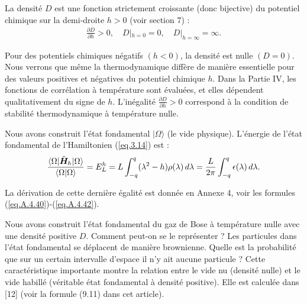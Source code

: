 La densité \( D \) est une fonction strictement croissante (donc bijective) du potentiel chimique sur la demi-droite \( h > 0 \) (voir section 7) :
\begin{eqnarray}
	\frac{\partial D}{\partial h} > 0, \quad D|_{h=0} = 0, \quad D|_{h = \infty} = \infty.	
\end{eqnarray}

Pour des potentiels chimiques négatifs \( (h < 0) \), la densité est nulle \( (D = 0) \). Nous verrons que même la thermodynamique diffère de manière essentielle pour des valeurs positives et négatives du potentiel chimique \( h \). Dans la Partie IV, les fonctions de corrélation à température sont évaluées, et elles dépendent qualitativement du signe de \( h \). L'inégalité \( \frac{\partial D}{\partial h} > 0 \) correspond à la condition de stabilité thermodynamique à température nulle.

Nous avons construit l'état fondamental \( | \Omega \rangle \) (le vide physique). L'énergie de l'état fondamental de l'Hamiltonien (\ref{eq.3.14}) est :
\begin{eqnarray}
	\frac{ \langle \Omega \vert \hat{\bm{H}}_h \vert  \Omega \rangle }{ \langle \Omega \vert \Omega \rangle } = E_L^h = L \int_{-q}^q (\lambda^2-h) \rho ( \lambda ) \, d\lambda = \frac{L}{2\pi} \int_{-q}^q \epsilon( \lambda ) \, d \lambda  .	
\end{eqnarray}

La dérivation de cette dernière égalité est donnée en Annexe 4, voir les formules (\ref{eq.A.4.40})-(\ref{eq.A.4.42}).

Nous avons construit l'état fondamental du gaz de Bose à température nulle avec une densité positive \( D \). Comment peut-on se le représenter ? Les particules dans l'état fondamental se déplacent de manière brownienne. Quelle est la probabilité que sur un certain intervalle d'espace il n'y ait aucune particule ? Cette caractéristique importante montre la relation entre le vide nu (densité nulle) et le vide habillé (véritable état fondamental à densité positive). Elle est calculée dans [12] (voir la formule (9.11) dans cet article).

